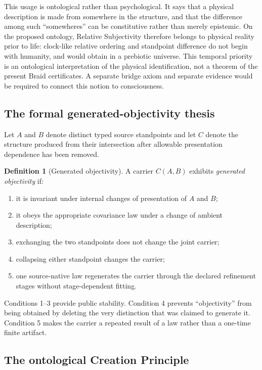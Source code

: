 \documentclass[11pt]{article}
\theoremstyle{definition}
\newtheorem{definition}[theorem]{Definition}
\theoremstyle{remark}
\begin{document}
This usage is ontological rather than psychological. It says that a physical description is made from somewhere in the structure, and that the difference among such ``somewheres'' can be constitutive rather than merely epistemic. On the proposed ontology, Relative Subjectivity therefore belongs to physical reality prior to life: clock-like relative ordering and standpoint difference do not begin with humanity, and would obtain in a prebiotic universe. This temporal priority is an ontological interpretation of the physical identification, not a theorem of the present Braid certificates. A separate bridge axiom and separate evidence would be required to connect this notion to consciousness.

\subsection{The formal generated-objectivity thesis}

Let $A$ and $B$ denote distinct typed source standpoints and let $C$ denote the structure produced from their intersection after allowable presentation dependence has been removed.

\begin{definition}[Generated objectivity]\label{def:go}
A carrier $C(A,B)$ exhibits \emph{generated objectivity} if:
\begin{enumerate}
\item it is invariant under internal changes of presentation of $A$ and $B$;
\item it obeys the appropriate covariance law under a change of ambient description;
\item exchanging the two standpoints does not change the joint carrier;
\item collapsing either standpoint changes the carrier;
\item one source-native law regenerates the carrier through the declared refinement stages without stage-dependent fitting.
\end{enumerate}
\end{definition}

Conditions 1--3 provide public stability. Condition 4 prevents ``objectivity'' from being obtained by deleting the very distinction that was claimed to generate it. Condition 5 makes the carrier a repeated result of a law rather than a one-time finite artifact.

\subsection{The ontological Creation Principle}
\end{document}
